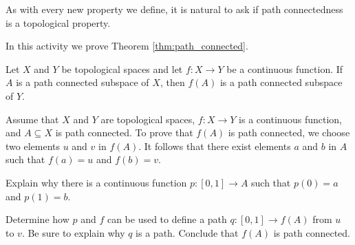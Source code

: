 \label{sec_path_connect}

As with every new property we define, it is natural to ask if path connectedness is a topological property.

\begin{activity} In this activity we prove Theorem \ref{thm:path_connected}.

\begin{theorem} \label{thm:path_connected} Let $X$ and $Y$ be topological spaces and let $f : X \to Y$ be a continuous function. If $A$ is a path connected subspace of $X$, then $f(A)$ is a path connected subspace of $Y$. 
\end{theorem}

Assume that $X$ and $Y$ are topological spaces, $f : X \to Y$ is a continuous function, and $A \subseteq X$ is path connected. To prove that $f(A)$ is path connected, we choose two elements $u$ and $v$ in $f(A)$. It follows that there exist elements $a$ and $b$ in $A$ such that $f(a) = u$ and $f(b) = v$. 

\ba

\item Explain why there is a continuous function $p: [0,1] \to A$ such that $p(0) = a$ and $p(1) = b$. 

\item Determine how $p$ and $f$ can be used to define a path $q: [0,1] \to f(A)$ from $u$ to $v$. Be sure to explain why $q$ is a  path. Conclude that $f(A)$ is path connected. 

\ea

\end{activity}

\begin{comment}

\ActivitySolution

\ba

\item Since $A$ is path connected, there is a path $p$ in $A$ from $a$ to $b$. That is, $p: [0,1] \to A$ is a continuous function such that $p(0) = a$ and $p(1) = b$. 

\item Let $q : [0,1] \to f(A)$ be defined by $q= f \circ p$. As a composite of continuous functions we know that $q$ is a continuous function. Also, $q(0) = (fp)(0) = f(a) = u$ and $q(1) = (fp)(1) = f(b) = v$. Thus, $q$ is a path in $f(A)$ from $u$ to $v$ and $f(A)$ is path connected.

\ea

\end{comment}


